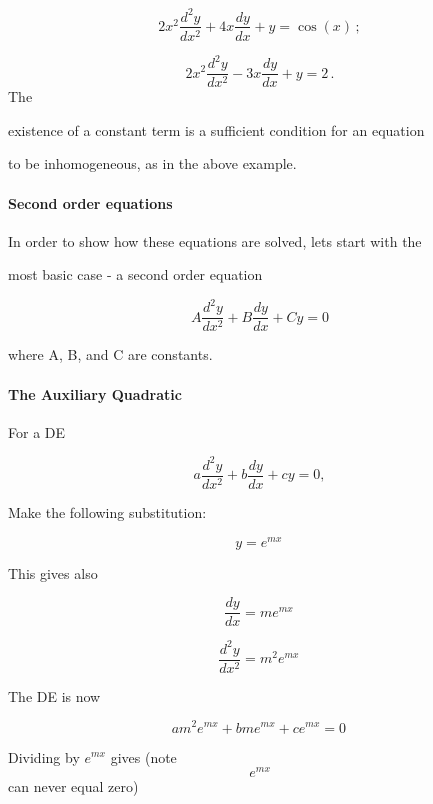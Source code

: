 $$2 x^2 \frac{d^2y}{dx^2} + 4 x \frac{dy}{dx} + y = \cos(x) \,;$$



$$2 x^2 \frac{d^2y}{dx^2} - 3 x \frac{dy}{dx} + y = 2 \,.$$ The

existence of a constant term is a sufficient condition for an equation

to be inhomogeneous, as in the above example.



\paragraph{Second order equations}



In order to show how these equations are solved, lets start with the

most basic case - a second order equation



$$A\frac{d^2y}{dx^2}+B\frac{dy}{dx}+Cy=0$$



where A, B, and C are constants.



\paragraph{The Auxiliary Quadratic}



For a DE



$$a\frac{d^2y}{dx^2}+b\frac{dy}{dx}+cy=0,$$



Make the following substitution:



$$y=e^{mx}\,$$



This gives also



$$\frac{dy}{dx}=me^{mx}\,$$



$$\frac{d^2y}{dx^2}=m^2e^{mx}\,$$



The DE is now



$$am^2e^{mx}+bme^{mx}+ce^{mx}=0 \,$$



Dividing by $e^{mx}$ gives (note$$e^{mx}$$ can never equal zero)




